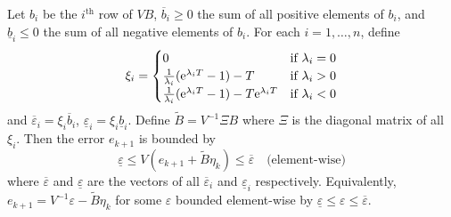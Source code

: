 \begin{theorem}
  \label{thm:averaged-sys-bound}
  Let $b_i$ be the $i^{\text{th}}$ row of $VB$, $\overbar{b}_i \geqslant 0$ the sum of all positive elements of $b_i$, and $\underline{b}_i \leqslant 0$ the sum of all negative elements of $b_i$.
  For each $i = 1,\ldots,n$, define
  \[ \xi_i =
  \begin{cases}
    0 & \text{if $\lambda_{i} = 0$} \\
    \frac{1}{\lambda_i} (\mathrm{e}^{\lambda_i T} - 1) - T & \text{if $\lambda_i > 0$}\\
    \frac{1}{\lambda_i} (\mathrm{e}^{\lambda_i T} - 1) - T \mathrm{e}^{\lambda_i T} & \text{if $\lambda_i < 0$}
  \end{cases} \]
  and $\overbar{\varepsilon}_{i} = \xi_{i} \overbar{b}_{i}$, $\underline{\varepsilon}_{i} = \xi_{i} \underline{b}_{i}$.
  Define $\tilde{B} = V^{-1} \Xi B$ where $\Xi$ is the diagonal matrix of all $\xi_{i}$.
  Then the error $e_{k+1}$ is bounded by
  \begin{equation*}
    \underline{\varepsilon} \leqslant V (e_{k+1} + \tilde{B} \eta_{k}) \leqslant \overbar{\varepsilon} \quad \text{(element-wise)}
  \end{equation*}
  where $\overbar{\varepsilon}$ and $\underline{\varepsilon}$ are the vectors of all $\overbar{\varepsilon}_{i}$ and $\underline{\varepsilon}_{i}$ respectively.
  Equivalently, $e_{k+1} = V^{-1} \varepsilon - \tilde{B} \eta_{k}$ for some $\varepsilon$ bounded element-wise by $\underline{\varepsilon} \leqslant \varepsilon \leqslant \overbar{\varepsilon}$.
\end{theorem}



